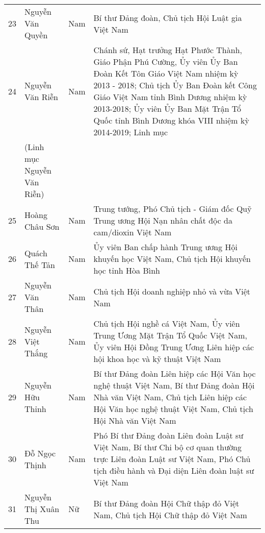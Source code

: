 \begin{longtable}{p{}p{}p{}p{}}
23 &
  Nguyễn Văn Quyền &
  Nam &
  Bí thư Đảng đoàn, Chủ tịch Hội Luật gia Việt Nam \\
24 &
  Nguyễn Văn Riễn &
  Nam &
  Chánh sứ, Hạt trưởng Hạt Phước Thành, Giáo Phận Phú Cường, Ủy viên Ủy Ban Đoàn Kết Tôn Giáo Việt Nam nhiệm kỳ 2013 - 2018; Chủ tịch Ủy Ban Đoàn kết Công Giáo Việt Nam tỉnh Bình Dương nhiệm kỳ 2013-2018; Ủy viên Ủy Ban Mặt Trận Tổ Quốc tỉnh Bình Dương khóa VIII nhiệm kỳ 2014-2019; Linh mục \\
 &
  (Linh mục Nguyễn Văn Riễn) &
 &
 \\
25 &
  Hoàng Châu Sơn &
  Nam &
  Trung tướng, Phó Chủ tịch - Giám đốc Quỹ Trung ương Hội Nạn nhân chất độc da cam/dioxin Việt Nam \\
26 &
  Quách Thế Tản &
  Nam &
  Ủy viên Ban chấp hành Trung ương Hội khuyến học Việt Nam, Chủ tịch Hội khuyến học tỉnh Hòa Bình \\
27 &
  Nguyễn Văn Thân &
  Nam &
  Chủ tịch Hội doanh nghiệp nhỏ và vừa Việt Nam \\
28 &
  Nguyễn Việt Thắng &
  Nam &
  Chủ tịch Hội nghề cá Việt Nam, Ủy viên Trung Ương Mặt Trận Tổ Quốc Việt Nam, Ủy viên Hội Đồng Trung Ương Liên hiệp các hội khoa học và kỹ thuật Việt Nam \\
29 &
  Nguyễn Hữu Thỉnh &
  Nam &
  Bí thư Đảng đoàn Liên hiệp các Hội Văn học nghệ thuật Việt Nam, Bí thư Đảng đoàn Hội Nhà văn Việt Nam, Chủ tịch Liên hiệp các Hội Văn học nghệ thuật Việt Nam, Chủ tịch Hội Nhà văn Việt Nam \\
30 &
  Đỗ Ngọc Thịnh &
  Nam &
  Phó Bí thư Đảng đoàn Liên đoàn Luật sư Việt Nam, Bí thư Chi bộ cơ quan thường trực Liên đoàn Luật sư Việt Nam, Phó Chủ tịch điều hành và Đại diện Liên đoàn luật sư Việt Nam \\
31 &
  Nguyễn Thị Xuân Thu &
  Nữ &
  Bí thư Đảng đoàn Hội Chữ thập đỏ Việt Nam, Chủ tịch Hội Chữ thập đỏ Việt Nam
\label{tab:my-table}
\end{longtable}
